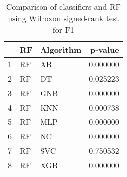 \begin{table}
\footnotesize
\caption{Comparison of classifiers and RF using Wilcoxon signed-rank test for F1}
\label{tab:RF wilcoxon F1 comparison}
\begin{tabular}{lllr}
\hline
 & RF & Algorithm & p-value \\
\hline
1 & RF & AB & 0.000000 \\
2 & RF & DT & 0.025223 \\
3 & RF & GNB & 0.000000 \\
4 & RF & KNN & 0.000738 \\
5 & RF & MLP & 0.000000 \\
6 & RF & NC & 0.000000 \\
7 & RF & SVC & 0.750532 \\
8 & RF & XGB & 0.000000 \\
\hline
\end{tabular}
\end{table}
